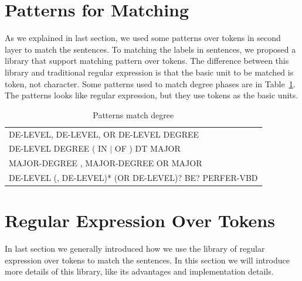 \section{Patterns for Matching}

As we explained in last section, we used some patterns over tokens in second layer to match the sentences. To matching the labels in sentences, we proposed a library that support matching pattern over tokens. The difference between this library and traditional regular expression is that the basic unit to be matched is token, not character. Some patterns used to match degree phases are in Table~\ref{tab:patterns}. The patterns looks like regular expression, but they use tokens as the basic units.

\begin{table}[ht]
\small
\caption{Patterns match degree} %
\centering %
\begin{tabular}{  | l  |  }
 \hline
 DE-LEVEL,  DE-LEVEL, OR  DE-LEVEL DEGREE   \\
 DE-LEVEL DEGREE ( IN  $\vert$  OF ) DT MAJOR   \\
 MAJOR-DEGREE  ,  MAJOR-DEGREE OR MAJOR \\
 DE-LEVEL (, DE-LEVEL)* (OR DE-LEVEL)? BE? PERFER-VBD   \\
 \hline
\end{tabular}
\label{tab:patterns} %
\end{table}





\section{Regular Expression Over Tokens}

In last section we generally introduced how we use the library of regular expression over tokens to match the sentences. In this section we will introduce more details of this library, like its advantages and implementation details.

